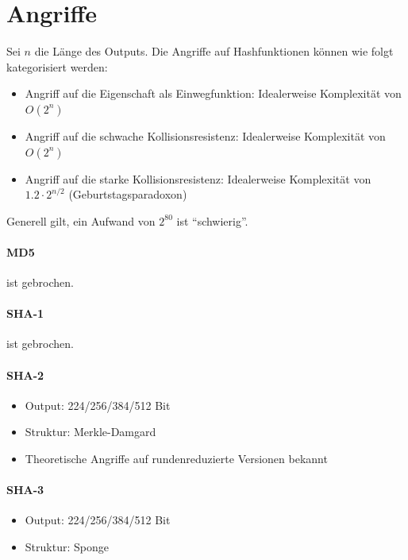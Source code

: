 \section{Angriffe}

Sei $n$ die Länge des Outputs. Die Angriffe auf Hashfunktionen können wie folgt kategorisiert werden:

\begin{itemize}
    \item Angriff auf die Eigenschaft als Einwegfunktion: Idealerweise Komplexität von $O(2^n)$
    \item Angriff auf die schwache Kollisionsresistenz: Idealerweise Komplexität von $O(2^n)$ 
    \item Angriff auf die starke Kollisionsresistenz: Idealerweise Komplexität von $1.2\cdot 2^{n/2}$ (Geburtstagsparadoxon)
\end{itemize}

Generell gilt, ein Aufwand von $2^{80}$ ist ``schwierig''.

\paragraph{MD5} ist gebrochen.
\paragraph{SHA-1} ist gebrochen.
\paragraph{SHA-2} 

\begin{itemize}
    \item Output: 224/256/384/512 Bit
    \item Struktur: Merkle-Damgard
    \item Theoretische Angriffe auf rundenreduzierte Versionen bekannt
\end{itemize}

\paragraph{SHA-3}

\begin{itemize}
    \item Output: 224/256/384/512 Bit
    \item Struktur: Sponge
\end{itemize}

